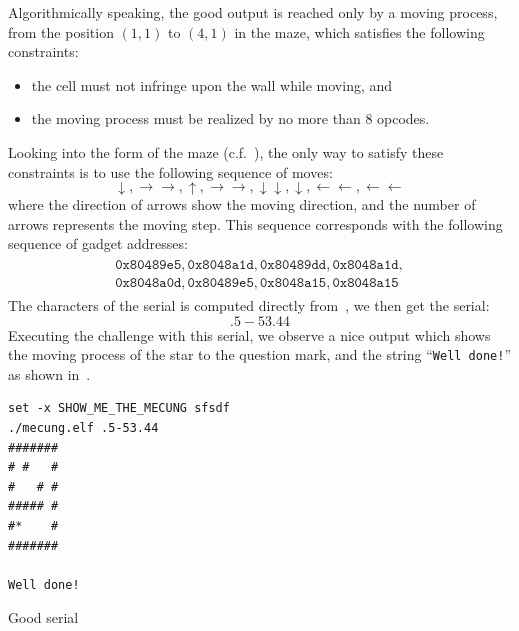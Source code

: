 \documentclass{easychair}
\begin{document}
Algorithmically speaking, the good output is reached only by a moving process, from the position $(1, 1)$ to $(4, 1)$ in the maze, which satisfies the following constraints:
\begin{itemize}
\item the cell must not infringe upon the wall while moving, and
\item the moving process must be realized by no more than $8$ opcodes.
\end{itemize}
Looking into the form of the maze (c.f.~), the only way to satisfy these constraints is to use the following sequence of moves:
\begin{equation}
  \downarrow, \rightarrow \rightarrow, \uparrow, \rightarrow \rightarrow, \downarrow \downarrow, \downarrow, \leftarrow \leftarrow, \leftarrow \leftarrow \label{equ:moving_sequence}
\end{equation}
where the direction of arrows show the moving direction, and the number of arrows represents the moving step. This sequence corresponds with the following sequence of gadget addresses:
\begin{align}
  \label{equ:gadget_addresses}
  \begin{split}
    \mathtt{0x80489e5}, \mathtt{0x8048a1d}, \mathtt{0x80489dd}, \mathtt{0x8048a1d}, \\
  \mathtt{0x8048a0d}, \mathtt{0x80489e5}, \mathtt{0x8048a15}, \mathtt{0x8048a15}
  \end{split}
\end{align}
The characters of the serial is computed directly from~, we then get the serial: 
\begin{equation*}
  \mathtt{.5-53.44}  
\end{equation*}
Executing the challenge with this serial, we observe a nice output which shows the moving process of the star to the question mark, and the string ``\texttt{Well done!}'' as shown in~.

\begin{listing}[ht]
  \begin{verbatim}
set -x SHOW_ME_THE_MECUNG sfsdf
./mecung.elf .5-53.44
#######
# #   #
#   # #
##### #
#*    #
#######

Well done!
  \end{verbatim}
  \caption{Good serial}
  \label{fig:good_serial}
\end{listing}
\end{document}

